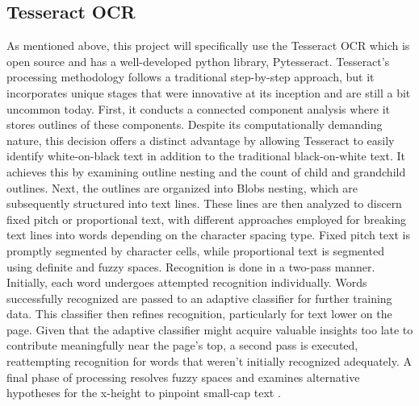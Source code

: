 \documentclass[10pt,twocolumn]{article}
\begin{document}
\subsection{Tesseract OCR}
As mentioned above, this project will specifically use the Tesseract OCR which is open source and has a well-developed python library, Pytesseract. Tesseract's processing methodology follows a traditional step-by-step approach, but it incorporates unique stages that were innovative at its inception and are still a bit uncommon today. First, it conducts a connected component analysis where it stores outlines of these components. Despite its computationally demanding nature, this decision offers a distinct advantage by allowing Tesseract to easily identify white-on-black text in addition to the traditional black-on-white text. It achieves this by examining outline nesting and the count of child and grandchild outlines. Next, the outlines are organized into Blobs nesting, which are subsequently structured into text lines. These lines are then analyzed to discern fixed pitch or proportional text, with different approaches employed for breaking text lines into words depending on the character spacing type. Fixed pitch text is promptly segmented by character cells, while proportional text is segmented using definite and fuzzy spaces. Recognition is done in a two-pass manner. Initially, each word undergoes attempted recognition individually. Words successfully recognized are passed to an adaptive classifier for further training data. This classifier then refines recognition, particularly for text lower on the page. Given that the adaptive classifier might acquire valuable insights too late to contribute meaningfully near the page's top, a second pass is executed, reattempting recognition for words that weren't initially recognized adequately. A final phase of processing resolves fuzzy spaces and examines alternative hypotheses for the x-height to pinpoint small-cap text \cite{tesseractOverview}.
\end{document}

